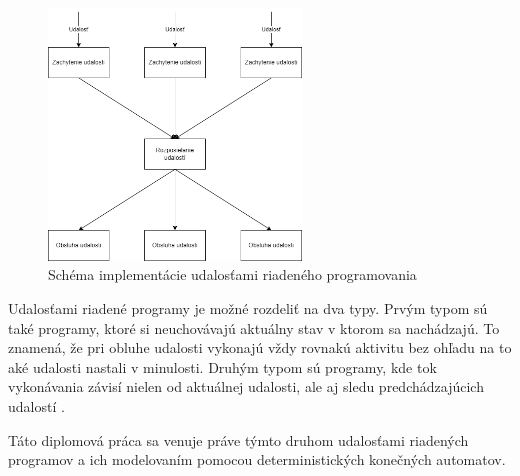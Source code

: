 \begin{figure}[!htbp]
  \centering
  \includegraphics[width=0.60\textwidth]{img/event-driven-schema.png}
  \caption{Schéma implementácie udalosťami riadeného programovania}
  \label{figure:event-driven-schema}
\end{figure}

\par
Udalosťami riadené programy je možné rozdeliť na dva typy. Prvým typom sú také programy, ktoré si neuchovávajú aktuálny stav v ktorom sa nachádzajú. To znamená, že pri obluhe udalosti vykonajú vždy rovnakú aktivitu bez ohľadu na to aké udalosti nastali v minulosti. Druhým typom sú programy, kde tok vykonávania závisí nielen od aktuálnej udalosti, ale aj sledu predchádzajúcich udalostí \cite{dashEventDrivenProgramming2011}. 
\par Táto diplomová práca sa venuje práve týmto druhom udalosťami riadených programov a ich modelovaním pomocou deterministických konečných automatov.